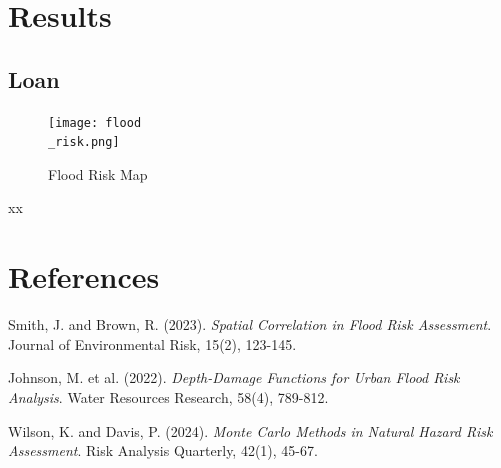 \documentclass{article}
\begin{document}
\newpage
\section{Results}
\subsection{Loan}
\vspace*{2cm}
\begin{figure}[h]
\centering
\texttt{[image: flood\\\_risk.png]}
\caption{Flood Risk Map}
\label{fig:flood_risk_map}
\end{figure}

xx

\section{References}
\begin{thebibliography}{9}

	Smith, J. and Brown, R. (2023).
	\textit{Spatial Correlation in Flood Risk Assessment}.
	Journal of Environmental Risk, 15(2), 123-145.

	Johnson, M. et al. (2022).
	\textit{Depth-Damage Functions for Urban Flood Risk Analysis}.
	Water Resources Research, 58(4), 789-812.

	Wilson, K. and Davis, P. (2024).
	\textit{Monte Carlo Methods in Natural Hazard Risk Assessment}.
	Risk Analysis Quarterly, 42(1), 45-67.

\end{thebibliography}
\end{document}
